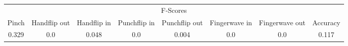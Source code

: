 \documentclass{standalone}
\begin{document}
 
 \begin{tabular}{|c|c|c|c|c|c|c ||c|}
\cline{1-8}\multicolumn{8}{|c|}{F-Scores} \\ 
\cline{1-8}Pinch & Handflip out & Handflip in & Punchflip in & Punchflip out & Fingerwave in & Fingerwave out & Accuracy\\ 
\cline{1-8}0.329 & 0.0 & 0.048 & 0.0 & 0.004 & 0.0 & 0.0 & 0.117\\ 
 \cline{1-8}\hline \end{tabular}
 
\end{document}
